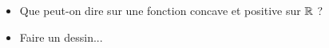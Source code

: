 \begin{itemize}
    \item Que peut-on dire sur une fonction concave et positive sur $\mathbb{R}$ ?
    \item Faire un dessin...
\end{itemize}